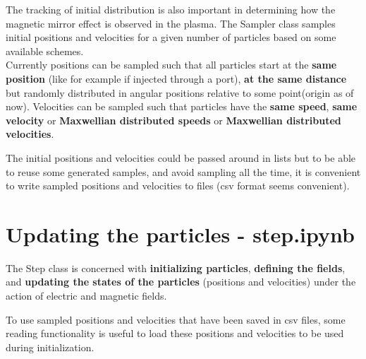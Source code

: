 \documentclass[12pt]{article}
\begin{document}
{		\noindent The tracking of initial distribution is also important in determining how the magnetic mirror effect is observed in the plasma. The Sampler class samples initial positions and velocities for a given number of particles based on some available schemes. \\
		
		\noindent Currently positions can be sampled such that all particles start at the \textbf{same position} (like for example if injected through a port), \textbf{at the same distance} but randomly distributed in angular positions relative to some point(origin as of now). Velocities can be sampled such that particles have the \textbf{same speed}, \textbf{same velocity} or \textbf{Maxwellian distributed speeds} or \textbf{Maxwellian distributed velocities}.   
		
		
		
		\noindent The initial positions and velocities could be passed around in lists but to be able to reuse some generated samples, and avoid sampling all the time, it is convenient to write sampled positions and velocities to files (csv format seems convenient).
		
		
		\section{Updating the particles - step.ipynb}
		The Step class is concerned with \textbf{initializing particles}, \textbf{defining the fields}, and \textbf{updating the states of the particles} (positions and velocities) under the action of electric and magnetic fields.
		
		
		\noindent To use sampled positions and velocities that have been saved in csv files, some reading functionality is useful to load these positions and velocities to be used during initialization.
		
		
}
\end{document}
